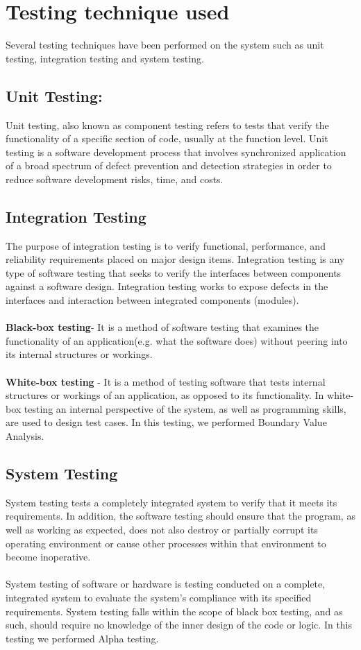 \documentclass[12pt]{report}
\begin{document}
\section{Testing technique used}
Several testing techniques have been performed on the system such as unit testing, 
integration testing and system testing. 
\subsection{Unit Testing: }
Unit testing, also known as component testing refers to tests that verify the 
functionality of a specific section of code, usually at the function level. Unit 
testing is a software development process that involves synchronized 
application of a broad spectrum of defect prevention and detection strategies 
in order to reduce software development risks, time, and costs. 
\subsection{Integration Testing }
The purpose of integration testing is to verify functional, performance, and 
reliability requirements placed on major design items. Integration testing is 
any type of software testing that seeks to verify the interfaces between 
components against a software design. Integration testing works to expose 
defects in the interfaces and interaction between integrated components 
(modules). 
\\
\\
\textbf{Black-box testing}- It is a method of software testing that examines the 
functionality of an application(e.g. what the software does) without 
peering into its internal structures or workings. 
\\
\\
\textbf{White-box testing} - It is a method of testing software that tests internal 
structures or workings of an application, as opposed to its 
functionality. In white-box testing an internal perspective of the 
system, as well as programming skills, are used to design test cases. 
In this testing, we performed Boundary Value Analysis. 

\subsection{System Testing}
System testing tests a completely integrated system to verify that it meets its 
requirements. In addition, the software testing should ensure that the program, 
as well as working as expected, does not also destroy or partially corrupt its 
operating environment or cause other processes within that environment to 
become inoperative. 
\\
\\
System testing of software or hardware is testing conducted on a complete, 
integrated system to evaluate the system's compliance with its specified 
requirements. System testing falls within the scope of black box testing, and as 
such, should require no knowledge of the inner design of the code or logic. In this testing we performed Alpha testing. 
\end{document}
